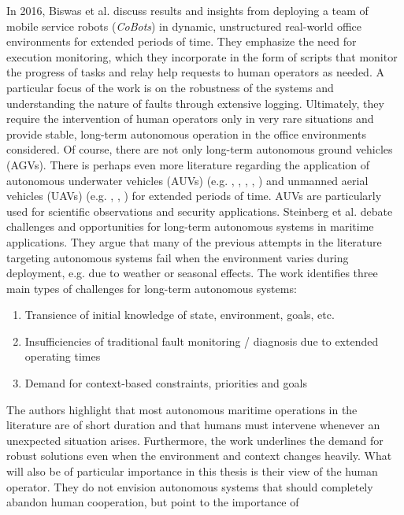 \documentclass[english, master, utf8]{base/thesis_KBS}
\begin{document}
In 2016, Biswas et al. \cite{Biswas:2016} discuss results and insights from deploying a team of mobile service robots (\textit{CoBots}) in dynamic, unstructured real-world office environments
for extended periods of time. They emphasize the need for execution monitoring, which they incorporate in the form of scripts that monitor the progress of tasks and relay help
requests to human operators as needed. A particular focus of the work is on the robustness of the systems and understanding the nature of faults through extensive logging.
Ultimately, they require the intervention of human operators only in very rare situations and provide stable, long-term autonomous operation in the office environments considered.
\newline
Of course, there are not only long-term autonomous ground vehicles (AGVs). There is perhaps even more literature regarding the application of autonomous underwater vehicles (AUVs)
(e.g. \cite{Jones:2012}, \cite{Spears:2014}, \cite{Kunz:2009}, \cite{Chrpa:2015}, \cite{Harris:2021}) and unmanned aerial vehicles (UAVs) (e.g. \cite{Brommer:2018}, \cite{Dong:2014},
\cite{Dong:2017}) for extended periods of time. AUVs are particularly used for scientific observations and security applications. \cite{Chrpa:2015}
Steinberg et al. \cite{Steinberg:2016} debate challenges and opportunities for long-term autonomous systems in
maritime applications. They argue that many of the previous attempts in the literature targeting autonomous systems fail when the environment varies during deployment, e.g.
due to weather or seasonal effects. The work identifies three main types of challenges for long-term autonomous systems:
\begin{enumerate}
    \item Transience of initial knowledge of state, environment, goals, etc.
    \item Insufficiencies of traditional fault monitoring / diagnosis due to extended operating times
    \item Demand for context-based constraints, priorities and goals
\end{enumerate}
The authors highlight that most autonomous maritime operations in the literature are of short duration and that humans must intervene whenever an unexpected situation arises. 
Furthermore, the work underlines the demand for robust solutions even when the environment and context changes heavily. What will also be of particular importance
in this thesis is their view of the human operator. They do not envision autonomous systems that should completely abandon human cooperation, but point to the importance of
\end{document}
